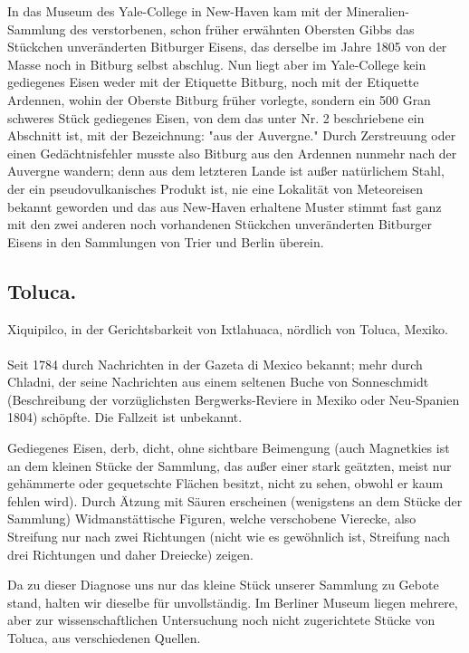 \documentclass[a4paper, 11pt, oneside, polutonikogreek, german]{article}
\begin{document}
In das Museum des Yale-College in New-Haven kam mit der Mineralien-Sammlung des verstorbenen, schon früher erwähnten Obersten Gibbs das Stückchen unveränderten Bitburger Eisens, das derselbe im Jahre 1805 von der Masse noch in Bitburg selbst abschlug. Nun liegt aber im Yale-College kein gediegenes Eisen weder mit der Etiquette Bitburg, noch mit der Etiquette Ardennen, wohin der Oberste Bitburg früher vorlegte, sondern ein 500 Gran schweres Stück gediegenes Eisen, von dem das unter Nr. 2 beschriebene ein Abschnitt ist, mit der Bezeichnung: "aus der Auvergne." Durch Zerstreuung oder einen Gedächtnisfehler musste also Bitburg aus den Ardennen nunmehr nach der Auvergne wandern; denn aus dem letzteren Lande ist außer natürlichem Stahl, der ein pseudovulkanisches Produkt ist, nie eine Lokalität von Meteoreisen bekannt geworden und das aus New-Haven erhaltene Muster stimmt fast ganz mit den zwei anderen noch vorhandenen Stückchen unveränderten Bitburger Eisens in den Sammlungen von Trier und Berlin überein.
\subsection{Toluca.}
\begin{center}
\small
Xiquipilco, in der Gerichtsbarkeit von Ixtlahuaca, nördlich von Toluca, Mexiko.
\end{center}
\paragraph{}
Seit 1784 durch Nachrichten in der Gazeta di Mexico bekannt; mehr durch Chladni, der seine Nachrichten aus einem seltenen Buche von Sonneschmidt (Beschreibung der vorzüglichsten Bergwerks-Reviere in Mexiko oder Neu-Spanien 1804) schöpfte. Die Fallzeit ist unbekannt.

Gediegenes Eisen, derb, dicht, ohne sichtbare Beimengung (auch Magnetkies ist an dem kleinen Stücke der Sammlung, das außer einer stark geätzten, meist nur gehämmerte oder gequetschte Flächen besitzt, nicht zu sehen, obwohl er kaum fehlen wird). Durch Ätzung mit Säuren erscheinen (wenigstens an dem Stücke der Sammlung) Widmanstättische Figuren, welche verschobene Vierecke, also Streifung nur nach zwei Richtungen (nicht wie es gewöhnlich ist, Streifung nach drei Richtungen und daher Dreiecke) zeigen.

Da zu dieser Diagnose uns nur das kleine Stück unserer Sammlung zu Gebote stand, halten wir dieselbe für unvollständig. Im Berliner Museum liegen mehrere, aber zur wissenschaftlichen Untersuchung noch nicht zugerichtete Stücke von Toluca, aus verschiedenen Quellen.
\end{document}
